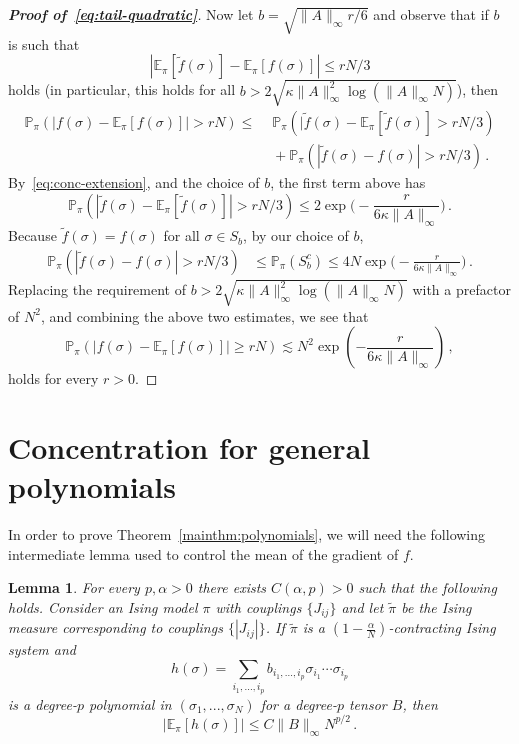 \documentclass[reqno,11pt]{amsart}
\numberwithin{equation}{section}
\newtheorem{lemma}[theorem]{Lemma}
\theoremstyle{definition}{
\newtheorem{example}[theorem]{Example}
\newtheorem{definition}[theorem]{Definition}
\newtheorem*{definition*}{Definition}
\newtheorem{problem}[theorem]{Problem}
\newtheorem{question}[theorem]{Question}
\newtheorem{remark}[theorem]{Remark}
}
\begin{document}
\begin{proof}[\textbf{\emph{Proof of~\eqref{eq:tail-quadratic}}}]
Now let $b=\sqrt {{\|A\|_\infty r}/6}$ and observe that if $b$ is such that 
\[|\mathbb E_{\pi}[\tilde f(\sigma)] -\mathbb E_{\pi}[f(\sigma)]|\leq rN/3
\]
holds (in particular, this holds for all $b> 2\sqrt {\kappa \|A\|^2_\infty \log (\|A\|_\infty N)}$), then
\begin{align*}
\mathbb P_{\pi} (|f(\sigma)-\mathbb E_{\pi} [f(\sigma)] | > rN) \leq & \,\,\mathbb P_{\pi} (|\tilde f(\sigma)-\mathbb E_{\pi} [\tilde f(\sigma)] > rN/3)\\ 
& \,\, + \mathbb P_{\pi} (|\tilde f(\sigma)-f(\sigma)|> rN/3)\,.
\end{align*}
By~\eqref{eq:conc-extension}, and the choice of $b$, the first term above has
\[\mathbb P_{\pi} (|\tilde f(\sigma)-\mathbb E_\pi [\tilde f(\sigma)]| > rN/3) \leq 2\exp\bigg( -\frac r {6\kappa \|A\|_\infty} \bigg)\,.
\]
Because $\tilde f(\sigma) = f(\sigma)$ for all $\sigma \in S_b$, by our choice of $b$,
\begin{align*}
\mathbb P_{\pi} (|\tilde f(\sigma)-f(\sigma)| > rN/3)  & \leq \mathbb P_{\pi} (S_b^c) \leq 4N \exp\bigg (-\frac {r}{6 \kappa \|A\|_\infty}\bigg)\,.
\end{align*}
Replacing the requirement of $b>2\sqrt {\kappa \|A\|^2_\infty \log (\|A\|_\infty N)}$ with a prefactor of $N^2$, and combining the above two estimates, we see that
\[\mathbb P_ \pi(|f(\sigma)-\mathbb E_{\pi}[f(\sigma)]|\geq rN) \lesssim N^2 \exp \left(-\frac{r}{6 \kappa \|A\|_\infty}\right)\,,
\]
holds for every $r>0$.
\end{proof}

\section{Concentration for general polynomials}

In order to prove Theorem~\ref{mainthm:polynomials}, we will need the following intermediate lemma used to control the mean of the gradient of $f$. 

\begin{lemma}\label{lem:gradient-mean}
For every $p,\alpha>0$ there exists $C(\alpha,p)>0$ such that the following holds. Consider an Ising model $\pi$ with couplings $\{J_{ij}\}$ and let $\tilde \pi$ be the Ising measure corresponding to couplings $\{|J_{ij}|\}$. If $\tilde \pi$ is a $(1-\frac{\alpha}N)$-contracting Ising system and 
\[
h(\sigma)= \sum_{i_1,...,i_p} b_{i_1,...,i_p} \sigma_{i_1}\cdots \sigma_{i_p}
\]
 is a degree-$p$ polynomial in $(\sigma_1,...,\sigma_N)$ for a degree-$p$ tensor $B$, then
\[|\mathbb E_{\pi} [h(\sigma)]| \leq C\|B\|_\infty N^{p/2}\,.
\]
\end{lemma}
\end{document}
